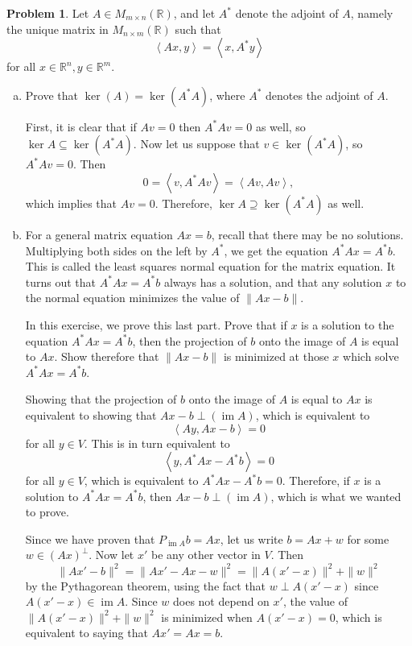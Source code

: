 \documentclass[11pt,oneside]{amsart}
\theoremstyle{definition}
\newtheorem{problem}{Problem}
\newcommand{\bR}{\mathbb{R}}
\newcommand{\innerprod}[1]{\left\langle#1\right\rangle}
\DeclareMathOperator{\im}{im}
\begin{document}
    \begin{problem}
        Let $A\in M_{m\times n}(\bR)$, and let $A^*$ denote the adjoint of $A$, namely the unique matrix in $M_{n\times m}(\bR)$ such that
        \[\innerprod{Ax,y}=\innerprod{x,A^*y}\]
        for all $x\in \bR^n, y\in\bR^m$.
        \leavevmode\begin{enumerate}[(a)]
            \item Prove that $\ker(A)=\ker(A^*A)$, where $A^*$ denotes the adjoint of $A$.
            \begin{solution}
                First, it is clear that if $Av=0$ then $A^*Av=0$ as well, so $\ker A\subseteq \ker(A^*A)$. Now let us suppose that $v\in \ker(A^*A)$, so $A^*Av=0$. Then
                \[0=\innerprod{v,A^*Av}=\innerprod{Av,Av},\]
                which implies that $Av=0$. Therefore, $\ker A\supseteq \ker(A^*A)$ as well.
            \end{solution}
            \item For a general matrix equation $Ax=b$, recall that there may be no solutions. Multiplying both sides on the left by $A^*$, we get the equation $A^*Ax=A^*b$. This is called the least squares normal equation for the matrix equation. It turns out that $A^*Ax=A^*b$ always has a solution, and that any solution $x$ to the normal equation minimizes the value of $\|Ax-b\|$.
            
            In this exercise, we prove this last part. Prove that if $x$ is a solution to the equation $A^*Ax=A^*b$, then the projection of $b$ onto the image of $A$ is equal to $Ax$. Show therefore that $\|Ax-b\|$ is minimized at those $x$ which solve $A^*Ax=A^*b$.
            \begin{solution}
                Showing that the projection of $b$ onto the image of $A$ is equal to $Ax$ is equivalent to showing that $Ax-b\perp(\im A)$, which is equivalent to
                \[\innerprod{Ay,Ax-b}=0\]
                for all $y\in V$. This is in turn equivalent to
                \[\innerprod{y,A^*Ax-A^*b}=0\]
                for all $y\in V$, which is equivalent to $A^*Ax-A^*b=0$. Therefore, if $x$ is a solution to $A^*Ax=A^*b$, then $Ax-b\perp(\im A)$, which is what we wanted to prove.

                Since we have proven that $P_{\im A}b=Ax$, let us write $b=Ax+w$ for some $w\in(Ax)^\perp$. Now let $x'$ be any other vector in $V$. Then
                \[\|Ax'-b\|^2=\|Ax'-Ax-w\|^2=\|A(x'-x)\|^2+\|w\|^2\]
                by the Pythagorean theorem, using the fact that $w\perp A(x'-x)$ since $A(x'-x)\in\im A$. Since $w$ does not depend on $x'$, the value of $\|A(x'-x)\|^2+\|w\|^2$ is minimized when $A(x'-x)=0$, which is equivalent to saying that $Ax'=Ax=b$.
            \end{solution}
        \end{enumerate}
    \end{problem}
\end{document}
